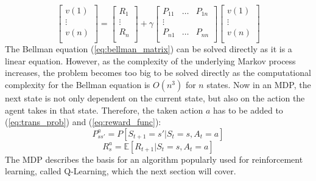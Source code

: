 \documentclass[12pt,a4paper]{article}
\begin{document}
\begin{equation}
    \label{eq:bellman_matrix}
    \begin{bmatrix}
        v(1)\\
        \vdots\\
        v(n)\\
    \end{bmatrix} = \begin{bmatrix}
        R_1\\
        \vdots\\
        R_n\\
    \end{bmatrix} + \gamma \begin{bmatrix}
        P_{11} & \dots & P_{1n}\\
        \vdots\\
        P_{n1} & \dots & P_{nn}\\
    \end{bmatrix}  
    \begin{bmatrix}
        v(1)\\
        \vdots\\
        v(n)\\
    \end{bmatrix}
\end{equation}
The Bellman equation (\ref{eq:bellman_matrix}) can be solved directly as it is a linear equation. However, as the complexity of the underlying Markov process increases, the problem becomes too big to be solved directly as the computational complexity for the Bellman equation is $O(n^3)$ for $n$ states.
\newline
Now in an MDP, the next state is not only dependent on the current state, but also on the action the agent takes in that state. Therefore, the taken action $a$ has to be added to (\ref{eq:trans_prob}) and (\ref{eq:reward_func}):
\begin{equation}
    \label{eq:trans_prob_with_action}
    P_{ss'}^a = P[S_{t+1} = s' | S_t =s, A_t = a]
\end{equation}
\begin{equation}
    \label{eq:reward_func_with_action}
    R_s^a = \mathbb{E}[R_{t+1}|S_t = s, A_t = a]
\end{equation}
The MDP describes the basis for an algorithm popularly used for reinforcement learning, called Q-Learning, which the next section will cover.
\end{document}
